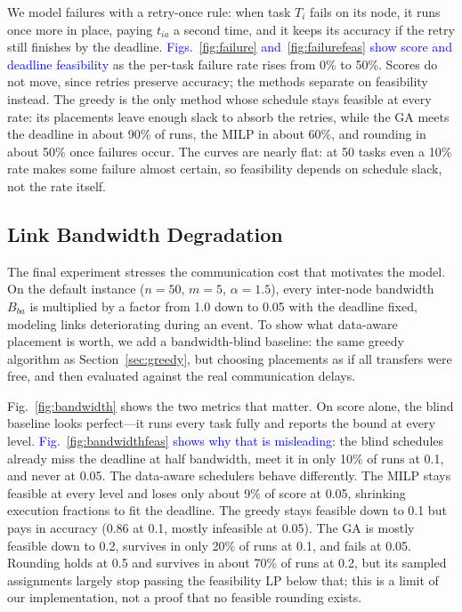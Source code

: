 \documentclass[conference]{IEEEtran}
\newcommand{\rev}[1]{\textcolor{blue}{#1}}%
\begin{document}
We model failures with a retry-once rule: when task $T_i$ fails on its node, it runs once more in place, paying $t_{ia}$ a second time, and it keeps its accuracy if the retry still finishes by the deadline. \rev{Figs.~\ref{fig:failure} and~\ref{fig:failurefeas} show score and deadline feasibility} as the per-task failure rate rises from 0\% to 50\%. Scores do not move, since retries preserve accuracy; the methods separate on feasibility instead. The greedy is the only method whose schedule stays feasible at every rate: its placements leave enough slack to absorb the retries, while the GA meets the deadline in about 90\% of runs, the MILP in about 60\%, and rounding in about 50\% once failures occur. The curves are nearly flat: at 50 tasks even a 10\% rate makes some failure almost certain, so feasibility depends on schedule slack, not the rate itself.

\subsection{Link Bandwidth Degradation}
\label{sec:eval-bw}

The final experiment stresses the communication cost that motivates the model. On the default instance ($n{=}50$, $m{=}5$, $\alpha{=}1.5$), every inter-node bandwidth $B_{ba}$ is multiplied by a factor from 1.0 down to 0.05 with the deadline fixed, modeling links deteriorating during an event. To show what data-aware placement is worth, we add a bandwidth-blind baseline: the same greedy algorithm as Section~\ref{sec:greedy}, but choosing placements as if all transfers were free, and then evaluated against the real communication delays.

Fig.~\ref{fig:bandwidth} shows the two metrics that matter. On score alone, the blind baseline looks perfect---it runs every task fully and reports the bound at every level. \rev{Fig.~\ref{fig:bandwidthfeas} shows why that is misleading}: the blind schedules already miss the deadline at half bandwidth, meet it in only 10\% of runs at 0.1, and never at 0.05. The data-aware schedulers behave differently. The MILP stays feasible at every level and loses only about 9\% of score at 0.05, shrinking execution fractions to fit the deadline. The greedy stays feasible down to 0.1 but pays in accuracy (0.86 at 0.1, mostly infeasible at 0.05). The GA is mostly feasible down to 0.2, survives in only 20\% of runs at 0.1, and fails at 0.05. Rounding holds at 0.5 and survives in about 70\% of runs at 0.2, but its sampled assignments largely stop passing the feasibility LP below that; this is a limit of our implementation, not a proof that no feasible rounding exists.
\end{document}
